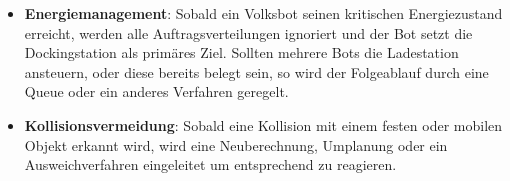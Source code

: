 \begin{itemize}
\item \textbf{Energiemanagement}: Sobald ein Volksbot seinen kritischen Energiezustand erreicht, werden alle Auftragsverteilungen ignoriert und der Bot setzt die Dockingstation als primäres Ziel. Sollten mehrere Bots die Ladestation ansteuern, oder diese bereits belegt sein, so wird der Folgeablauf durch eine Queue oder ein anderes Verfahren geregelt.

\item \textbf{Kollisionsvermeidung}: Sobald eine Kollision mit einem festen oder mobilen Objekt erkannt wird, wird eine Neuberechnung, Umplanung oder ein Ausweichverfahren eingeleitet um entsprechend zu reagieren.

\end{itemize}